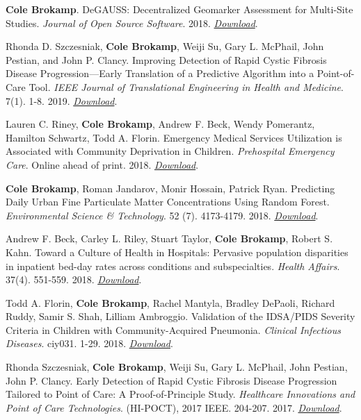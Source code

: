 \textbf{Cole Brokamp}. DeGAUSS: Decentralized Geomarker Assessment for
Multi-Site Studies. \emph{Journal of Open Source Software}. 2018.
\href{https://colebrokamp-website.s3.amazonaws.com/publications/Brokamp_JOSS_2018.pdf}{\emph{Download}}.

Rhonda D. Szczesniak, \textbf{Cole Brokamp}, Weiji Su, Gary L. McPhail,
John Pestian, and John P. Clancy. Improving Detection of Rapid Cystic
Fibrosis Disease Progression---Early Translation of a Predictive
Algorithm into a Point-of-Care Tool. \emph{IEEE Journal of Translational
Engineering in Health and Medicine}. 7(1). 1-8. 2019.
\href{https://colebrokamp-website.s3.amazonaws.com/publications/Szczesniak_IEEE_2018.pdf}{\emph{Download}}.

Lauren C. Riney, \textbf{Cole Brokamp}, Andrew F. Beck, Wendy Pomerantz,
Hamilton Schwartz, Todd A. Florin. Emergency Medical Services
Utilization is Associated with Community Deprivation in Children.
\emph{Prehospital Emergency Care}. Online ahead of print. 2018.
\href{https://colebrokamp-website.s3.amazonaws.com/publications/Riney_PrehospitalEmergencyCare_2018.pdf}{\emph{Download}}.

\textbf{Cole Brokamp}, Roman Jandarov, Monir Hossain, Patrick Ryan.
Predicting Daily Urban Fine Particulate Matter Concentrations Using
Random Forest. \emph{Environmental Science \& Technology}. 52 (7).
4173-4179. 2018.
\href{https://colebrokamp-website.s3.amazonaws.com/publications/Brokamp_EST_2018_onlineaheadofprint.pdf}{\emph{Download}}.

Andrew F. Beck, Carley L. Riley, Stuart Taylor, \textbf{Cole Brokamp},
Robert S. Kahn. Toward a Culture of Health in Hospitals: Pervasive
population disparities in inpatient bed-day rates across conditions and
subspecialties. \emph{Health Affairs}. 37(4). 551-559. 2018.
\href{https://colebrokamp-website.s3.amazonaws.com/publications/Beck_HealthAffairs_2018.pdf}{\emph{Download}}.

Todd A. Florin, \textbf{Cole Brokamp}, Rachel Mantyla, Bradley DePaoli,
Richard Ruddy, Samir S. Shah, Lilliam Ambroggio. Validation of the
IDSA/PIDS Severity Criteria in Children with Community-Acquired
Pneumonia. \emph{Clinical Infectious Diseases}. ciy031. 1-29. 2018.
\href{https://colebrokamp-website.s3.amazonaws.com/publications/Florin_ClinicalInfectiousDiseases_2018.pdf}{\emph{Download}}.

Rhonda Szczesniak, \textbf{Cole Brokamp}, Weiji Su, Gary L. McPhail,
John Pestian, John P. Clancy. Early Detection of Rapid Cystic Fibrosis
Disease Progression Tailored to Point of Care: A Proof-of-Principle
Study. \emph{Healthcare Innovations and Point of Care Technologies}.
(HI-POCT), 2017 IEEE. 204-207. 2017.
\href{https://colebrokamp-website.s3.amazonaws.com/publications/Szczesniak_IEEE_2017.pdf}{\emph{Download}}.

